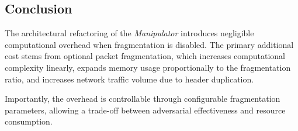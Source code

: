 \subsection{Conclusion}

The architectural refactoring of the \textit{Manipulator} introduces negligible computational overhead when fragmentation is disabled. The primary additional cost stems from optional packet fragmentation, which increases computational complexity linearly, expands memory usage proportionally to the fragmentation ratio, and increases network traffic volume due to header duplication.

Importantly, the overhead is controllable through configurable fragmentation parameters, allowing a trade-off between adversarial effectiveness and resource consumption.